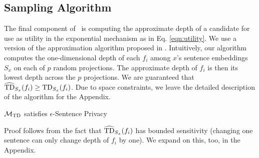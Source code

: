 %

\subsection{Sampling Algorithm}
The final component of \technique\ is computing the approximate depth of a candidate for use as utility in the exponential mechanism as in Eq. \eqref{eqn:utility}. We use a version of the approximation algorithm proposed in \cite{median_hyp}. Intuitively, our algorithm computes the one-dimensional depth of each $f_i$ among $x$'s sentence embeddings $S_x$ on each of $p$ random projections. The approximate depth of $f_i$ is then its lowest depth across the $p$ projections. We are guaranteed that $\widehat{\text{TD}}_{S_x}(f_i) \geq \text{TD}_{S_x}(f_i)$. Due to space constraints, we leave the detailed description of the algorithm for the Appendix.
\begin{theorem}
\label{thm:mainthm}
	$\mathcal{M}_{\text{TD}}$ satisfies $\epsilon$-Sentence Privacy
\end{theorem}
Proof follows from the fact that $\widehat{\text{TD}}_{S_x}(f_i)$ has bounded sensitivity (changing one sentence can only change depth of $f_i$ by one). We expand on this, too, in the Appendix. 







